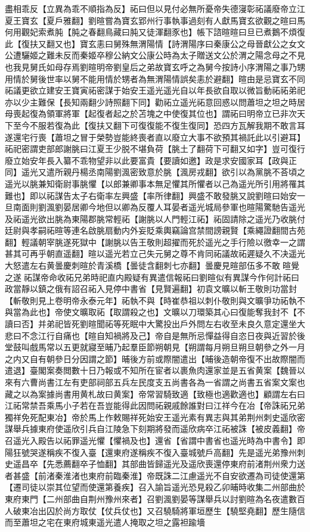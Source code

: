盡相乖反【立異為乖不順指為反】祏曰但以見付必無所憂帝失德寖彰祏議廢帝立江夏王寶玄【夏戶雅翻】劉暄嘗為寶玄郢州行事執事過刻有人獻馬寶玄欲觀之暄曰馬何用觀妃索煮肫【肫之春翻鳥藏曰肫又徒渾翻豕也】帳下諮暄暄曰旦已煮鵝不煩復此【復扶又翻又也】寶玄恚曰舅殊無渭陽情【詩渭陽序曰秦康公之母晉獻公之女文公遭驪姬之難未反而秦姬卒穆公納文公康公時為太子贈送文公於渭之陽念母之不見也我見舅氏如母存焉劉暄明帝劉皇后之弟故寶玄呼之為舅今按詩小序渭陽之事乃甥用情於舅後世率以舅不能用情於甥者為無渭陽情誤矣恚於避翻】暄由是忌寶玄不同祏議更欲立建安王寶寅祏密謀于始安王遥光遥光自以年長欲自取以微旨動祏祏弟祀亦以少主難保【長知兩翻少詩照翻下同】勸祏立遥光祏意回惑以問蕭坦之坦之時居母喪起復為領軍將軍【起復者起之於苫塊之中使復其位也】謂祏曰明帝立已非次天下至今不服若復為此【復扶又翻下可復復能不復生復同】恐四方瓦解我期不敢言耳遂還宅行喪【蕭坦之冒于榮勢豈能終喪者直以廢立大事不欲預其禍託此以引避耳】祏祀密謂吏部郎謝朓曰江夏王少脱不堪負荷【朓土了翻荷下可翻又如字】豈可復行廢立始安年長入纂不乖物望非以此要富貴【要讀如邀】政是求安國家耳【政與正同】遥光又遣所親丹楊丞南陽劉渢密致意於朓【渢房戎翻】欲引以為黨朓不荅頃之遥光以脁兼知衛尉事脁懼【以郎兼卿事本無足懼其所懼者以己為遥光所引用將罹其難也】即以祏謀告太子右衛率左興盛【率所律翻】興盛不敢發朓又說劉暄曰始安一旦南面則劉渢劉晏居卿今地但以卿為反覆人耳晏者遥光城局參軍也暄陽驚馳告遥光及祏遥光欲出脁為東陽郡脁常輕祏【謝朓以人門輕江祏】祏固請除之遥光乃收朓付廷尉與孝嗣祏暄等連名啟朓扇動内外妄貶乘輿竊論宫禁間謗親賢【乘繩證翻間古苑翻】輕議朝宰朓遂死獄中【謝朓以告王敬則超擢而死於遥光之手行險以徼幸一之謂甚其可再乎朝直遥翻】暄以遥光若立己失元舅之尊不肯同祏議故祏遲疑久不决遥光大怒遣左右黄曇慶刺暄於青溪橋【曇徒含翻刺七亦翻】曇慶見暄部伍多不敢暄覺之遂祏謀帝命收祏兄弟時祀直内殿疑有異遣信報祏曰劉暄似有異謀今作何計祏曰政當靜以鎮之俄有詔召祏入見停中書省【見賢遍翻】初袁文曠以斬王敬則功當封【斬敬則見上卷明帝永泰元年】祏執不與【時崔恭祖以刺仆敬則與文曠爭功祏執不與當為此也】帝使文曠取祏【取謂殺之也】文曠以刀環築其心曰復能奪我封不【不讀曰否】并弟祀皆死劉暄聞祏等死眠中大驚投出戶外問左右收至未良久意定還坐大悲曰不念江行自痛也【暄自知禍將及己】帝自是無所忌憚益得自恣日夜與近習於後堂鼓叫戲馬常以五更就寢至晡乃起羣臣節朔朝見【朔謂每月朔旦朔旦朝參之外一月之内又自有朝參日分因謂之節】晡後方前或際闇遣出【晡後造朝帝復不出故際闇而遣退】臺閣案奏閲數十日乃報或不知所在宦者以裹魚肉還家並是五省黄案【魏晉以來有六曹尚書江左有吏部祠部五兵左民度支五尚書各為一省謂之尚書五省案文案也藏之以為案據尚書用黄札故曰黄案】帝常習騎致適【致極也適歡適也】顧謂左右曰江祏常禁吾乘馬小子若在吾豈能得此因問祏親戚餘誰對曰江祥今在冶【帝誅祏兄弟獨祥免死配東冶】帝於馬上作敕賜祥死始安王遥光素有異志與其弟荆州刺史遥欣密謀舉兵據東府使遥欣引兵自江陵急下刻期將發而遥欣病卒江祏被誅【被皮義翻】帝召遥光入殿告以祏罪遥光懼【懼禍及也】還省【省謂中書省也遥光時為中書令】即陽狂號哭遂稱疾不復入臺【還東府遂稱疾不復入臺城號戶高翻】先是遥光弟豫州刺史遥昌卒【先悉薦翻卒子恤翻】其部曲皆歸遥光及遥欣喪還停東府前渚荆州衆力送者甚盛【前渚秦淮渚也東府前臨秦淮】帝既誅二江慮遥光不自安欲遷為司徒使還第【遷司徒以崇其位望而使還第養疾】召入諭旨遥光恐見殺乙卯晡時收集二州部曲於東府東門【二州部曲自荆州豫州來者】召劉渢劉晏等謀舉兵以討劉暄為名夜遣數百人破東冶出囚於尚方取仗【仗兵仗也】又召驍騎將軍垣歷生【驍堅堯翻】歷生隨信而至蕭坦之宅在東府城東遥光遣人掩取之坦之露袒踰墻